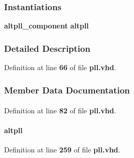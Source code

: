 \subsubsection*{Instantiations}
 \begin{DoxyCompactItemize}
\item 
{\bf altpll\+\_\+component}  {\bfseries altpll}   
\end{DoxyCompactItemize}


\subsubsection{Detailed Description}


Definition at line {\bf 66} of file {\bf pll.\+vhd}.



\subsubsection{Member Data Documentation}
\paragraph[{altpll}]{ {\bfseries \textcolor{vhdlchar}{ }} \hspace{0.3cm}{\ttfamily [Component]}}\label{classpll_1_1SYN_ad45c11bbc2e898d68e19fa2eb5ba73d5}


Definition at line {\bf 82} of file {\bf pll.\+vhd}.

\paragraph[{altpll\+\_\+component}]{ {\bfseries \textcolor{vhdlchar}{altpll}\textcolor{vhdlchar}{ }} \hspace{0.3cm}{\ttfamily [Instantiation]}}\label{classpll_1_1SYN_a70fc906d546df6812934a5430ac231a3}


Definition at line {\bf 259} of file {\bf pll.\+vhd}.

